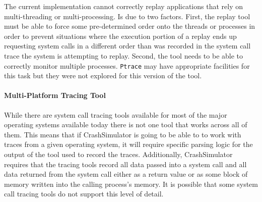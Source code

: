         The current implementation cannot correctly replay applications that rely on multi-threading or
        multi-processing.  Is due to two factors.  First, the replay tool must be able to force some pre-determined
        order onto the threads or processes in order to prevent situations where the execution portion of a replay ends
        up requesting system calls in a different order than was recorded in the system call trace the system is
        attempting to replay.  Second, the tool needs to be able to correctly monitor multiple processes. {\tt Ptrace}
        may have appropriate facilities for this task but they were not explored for this version of the tool.

        \paragraph{Multi-Platform Tracing Tool}

        While there are system call tracing tools available for most of the major operating systems available today
        there is not one tool that works across all of them.  This means that if CrashSimulator is going to be able to
        to work with traces from a given operating system, it will require specific parsing logic for the output of the
        tool used to record the traces.  Additionally, CrashSimulator requires that the tracing tools record all data
        passed into a system call and all data returned from the system call either as a return value or as some block
        of memory written into the calling process's memory.  It is possible that some system call tracing tools do not
        support this level of detail.
